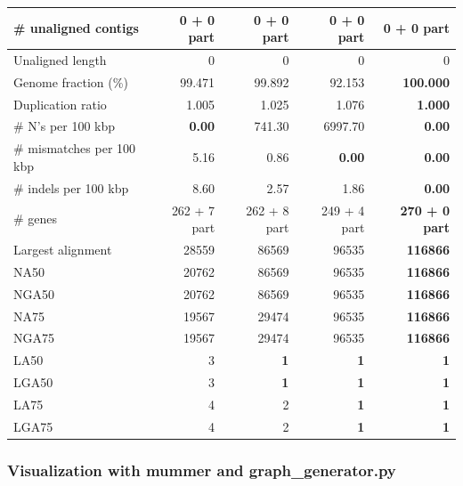 \documentclass[12pt, twocolumn]{article}
\begin{document}
\begin{table}[h!]
\begin{center}
{\begin{tabular}{|l*{4}{|r}|}
\# unaligned contigs & 0 + 0 part & 0 + 0 part & 0 + 0 part & 0 + 0 part \\ \hline
Unaligned length & 0 & 0 & 0 & 0 \\ \hline
Genome fraction (\%) & 99.471 & 99.892 & 92.153 & {\bf 100.000} \\ \hline
Duplication ratio & 1.005 & 1.025 & 1.076 & {\bf 1.000} \\ \hline
\# N's per 100 kbp & {\bf 0.00} & 741.30 & 6997.70 & {\bf 0.00} \\ \hline
\# mismatches per 100 kbp & 5.16 & 0.86 & {\bf 0.00} & {\bf 0.00} \\ \hline
\# indels per 100 kbp & 8.60 & 2.57 & 1.86 & {\bf 0.00} \\ \hline
\# genes & 262 + 7 part & 262 + 8 part & 249 + 4 part & {\bf 270 + 0 part} \\ \hline
Largest alignment & 28559 & 86569 & 96535 & {\bf 116866} \\ \hline
NA50 & 20762 & 86569 & 96535 & {\bf 116866} \\ \hline
NGA50 & 20762 & 86569 & 96535 & {\bf 116866} \\ \hline
NA75 & 19567 & 29474 & 96535 & {\bf 116866} \\ \hline
NGA75 & 19567 & 29474 & 96535 & {\bf 116866} \\ \hline
LA50 & 3 & {\bf 1} & {\bf 1} & {\bf 1} \\ \hline
LGA50 & 3 & {\bf 1} & {\bf 1} & {\bf 1} \\ \hline
LA75 & 4 & 2 & {\bf 1} & {\bf 1} \\ \hline
LGA75 & 4 & 2 & {\bf 1} & {\bf 1} \\ \hline
\end{tabular}
}
\end{center}
\end{table}
\newpage

\subsubsection{Visualization with mummer and graph\_generator.py}
\end{document}
